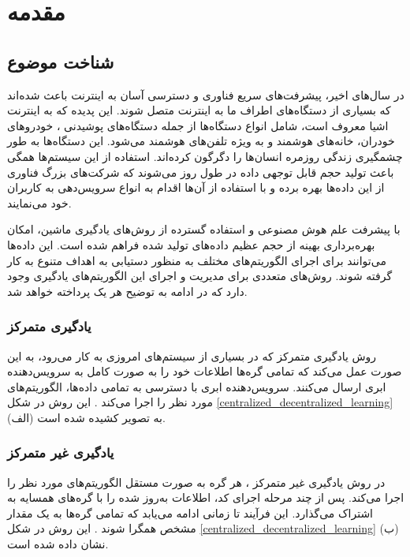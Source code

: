 \chapter{مقدمه}

\section{شناخت موضوع}
در سال‌های اخیر، پیشرفت‌های سریع فناوری و دسترسی آسان به اینترنت باعث شده‌اند که بسیاری از دستگاه‌های اطراف ما به اینترنت متصل شوند. این پدیده که به اینترنت اشیا%
معروف است، شامل انواع دستگاه‌ها از جمله دستگاه‌های پوشیدنی%
%
، خودروهای خودران، خانه‌های هوشمند%
و به ویژه تلفن‌های هوشمند%
می‌شود. این دستگاه‌ها به طور چشمگیری زندگی روزمره انسان‌ها را دگرگون کرده‌اند. استفاده از این سیستم‌ها همگی باعث تولید حجم قابل توجهی داده در طول روز می‌شوند که شرکت‌های بزرگ فناوری از این داده‌ها بهره برده و با استفاده از آن‌ها اقدام به انواع سرویس‌‌دهی به کاربران خود می‌نمایند.

با پیشرفت علم هوش مصنوعی و استفاده گسترده از روش‌های یادگیری ماشین، امکان بهره‌برداری بهینه از حجم عظیم داده‌های تولید شده فراهم شده است. این داده‌ها می‌توانند برای اجرای الگوریتم‌های مختلف به منظور دستیابی به اهداف متنوع به کار گرفته شوند. روش‌های متعددی برای مدیریت و اجرای این الگوریتم‌های یادگیری وجود دارد که در ادامه به توضیح هر یک پرداخته خواهد شد.


\subsection{یادگیری متمرکز}
روش یادگیری متمرکز%
که در بسیاری از سیستم‌های امروزی به کار می‌رود، به این صورت عمل می‌کند که تمامی گره‌ها%
اطلاعات خود را به صورت کامل به سرویس‌دهنده ابری%
ارسال می‌کنند. سرویس‌دهنده ابری با دسترسی به تمامی داده‌ها، الگوریتم‌های مورد نظر را اجرا می‌کند
\cite{elbir2022family}.
این روش در شکل
\ref{centralized_decentralized_learning}%
(الف) به تصویر کشیده شده است.


\subsection{یادگیری غیر متمرکز}
در روش یادگیری غیر متمرکز%
، هر گره به صورت مستقل الگوریتم‌های مورد نظر را اجرا می‌کند. پس از چند مرحله اجرای کد، اطلاعات به‌روز شده را با گره‌های همسایه به اشتراک می‌گذارد. این فرآیند تا زمانی ادامه می‌یابد که تمامی گره‌ها به یک مقدار مشخص همگرا شوند
\cite{zhou2019edge}.
این روش در شکل
\ref{centralized_decentralized_learning}%
(ب) نشان داده شده است.

